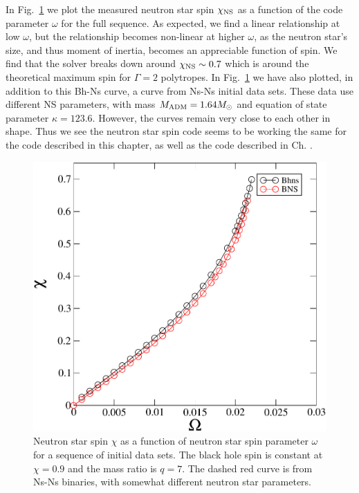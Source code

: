 In Fig.~\ref{fig:ChiVOmega} we plot the
measured neutron star spin $\chi_{\rm NS}$ as a function of the code
parameter $\omega$ for the full sequence. As expected, we find a linear
relationship at low $\omega$, but the relationship becomes non-linear
at higher $\omega$, as the neutron star's size, and thus moment of
inertia, becomes an appreciable function of spin. We find that the
solver breaks down around $\chi_{\rm NS}\sim 0.7$ which is around the
theoretical maximum spin for $\Gamma=2$ polytropes. In
Fig.~\ref{fig:ChiVOmega} we have also plotted, in addition to this
Bh-Ns curve, a curve from Ns-Ns initial data sets. These data use
different NS parameters, with mass $M_{\rm ADM}=1.64M_{\odot}$ and
equation of state parameter $\kappa=123.6$. However, the curves remain
very close to each other in shape. Thus we see the neutron star spin
code seems to be working the same for the code described in this
chapter, as well as the code described in Ch. .

\begin{figure}
\includegraphics[width=0.95\columnwidth]{chap4/chiVOmega}
\caption[$\chi_{\rm NS}$ as a function of $\omega_{\rm NS}$ for bh-ns
binaries]
{\label{fig:ChiVOmega}
Neutron star spin $\chi$ as a function of neutron star spin parameter
$\omega$ for a sequence of initial data sets. The black hole spin is
constant at $\chi=0.9$ and the mass ratio is $q=7$. The dashed red curve is
from Ns-Ns binaries, with somewhat different neutron star parameters.}
\end{figure}

